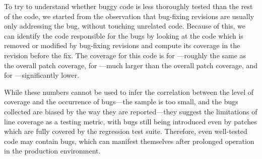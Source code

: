 To try to understand whether buggy code is less thoroughly tested than
the rest of the code, we started from the observation that bug-fixing
revisions are usually only addressing the bug, without touching
unrelated code.  Because of this, we can identify the code responsible
for the bugs by looking at the code which is removed or modified by
bug-fixing revisions and compute its coverage in the revision before
the fix.  The coverage for this code is \memcachedBugLineCoverage
for \memcached---roughly the same as the overall patch
coverage, \redisBugLineCoverage for \redis---much larger than the
overall patch coverage, and \zeromqBugLineCoverage
for \zeromq---significantly lower.




While these numbers cannot be used to infer the correlation between
the level of coverage and the occurrence of bugs---the sample is too
small, and the bugs collected are biased by the way they are
reported---they suggest the limitations of line coverage as a testing
metric, with bugs still being introduced even by patches which are
fully covered by the regression test suite. Therefore, even well-tested
code may contain bugs, which can manifest themselves after prolonged
operation in the production environment.


